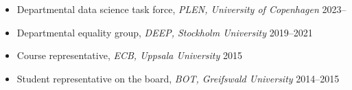 \documentclass[11pt]{article}
\begin{document}
\vspace{-0.175cm}
\begin{itemize}[label={},itemindent=-9pt,leftmargin=24pt]
	\itemsep-0.1cm
	\item Departmental data science task force, \textit{PLEN, University of Copenhagen} \hfill 2023--
	\item Departmental equality group, \textit{DEEP, Stockholm University}  \hfill 2019--2021
	\item Course representative, \textit{ECB, Uppsala University} \hfill 2015
	\item Student representative on the board, \textit{BOT, Greifswald University} \hfill 2014--2015
\end{itemize}
\end{document}
